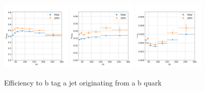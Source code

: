 \begin{figure}[h!]
    \centering
    \includegraphics[width=0.3\textwidth]{chapters/Appendix/sectionBtag/figures/bmva_mceff_vs_pt_b}
    \includegraphics[width=0.3\textwidth]{chapters/Appendix/sectionBtag/figures/bmva_mceff_vs_pt_c}
    \includegraphics[width=0.3\textwidth]{chapters/Appendix/sectionBtag/figures/bmva_mceff_vs_pt_usdg}
    \caption{Efficiency to b tag a jet originating from a b quark
    \label{fig:btag_eff}
    }
\end{figure}

\FloatBarrier

